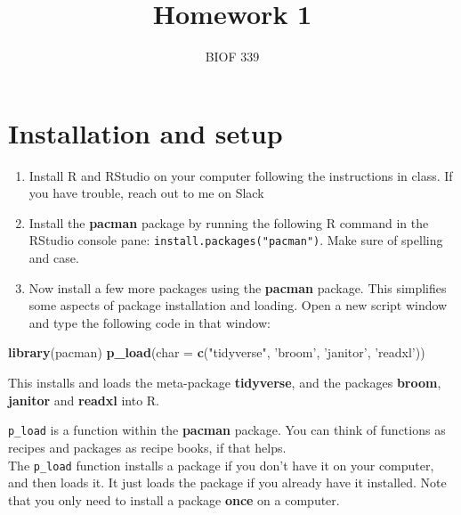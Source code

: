 \documentclass[
]{article}
\title{Homework 1}
\author{BIOF 339}
\date{}
\newenvironment{Shaded}{\begin{snugshade}}{\end{snugshade}}
\newcommand{\DataTypeTok}[1]{\textcolor[rgb]{0.13,0.29,0.53}{#1}}
\newcommand{\KeywordTok}[1]{\textcolor[rgb]{0.13,0.29,0.53}{\textbf{#1}}}
\newcommand{\NormalTok}[1]{#1}
\newcommand{\StringTok}[1]{\textcolor[rgb]{0.31,0.60,0.02}{#1}}
\providecommand{\tightlist}{%
  \setlength{\itemsep}{0pt}\setlength{\parskip}{0pt}}
\begin{document}
\maketitle

\hypertarget{installation-and-setup}{%
\section{Installation and setup}\label{installation-and-setup}}

\begin{enumerate}
\def\labelenumi{\arabic{enumi}.}
\tightlist
\item
  Install R and RStudio on your computer following the instructions in
  class. If you have trouble, reach out to me on Slack
\item
  Install the \textbf{pacman} package by running the following R command
  in the RStudio console pane: \texttt{install.packages("pacman")}. Make
  sure of spelling and case.
\item
  Now install a few more packages using the \textbf{pacman} package.
  This simplifies some aspects of package installation and loading. Open
  a new script window and type the following code in that window:
\end{enumerate}

\begin{Shaded}
\begin{Highlighting}[]
\KeywordTok{library}\NormalTok{(pacman)}
\KeywordTok{p_load}\NormalTok{(}\DataTypeTok{char =} \KeywordTok{c}\NormalTok{(}\StringTok{"tidyverse"}\NormalTok{, }\StringTok{'broom'}\NormalTok{, }\StringTok{'janitor'}\NormalTok{, }\StringTok{'readxl'}\NormalTok{))}
\end{Highlighting}
\end{Shaded}

This installs and loads the meta-package \textbf{tidyverse}, and the
packages \textbf{broom}, \textbf{janitor} and \textbf{readxl} into R.

\begin{infobox}

\texttt{p\_load} is a function within the \textbf{pacman} package. You
can think of functions as recipes and packages as recipe books, if that
helps.\\
The \texttt{p\_load} function installs a package if you don't have it on
your computer, and then loads it. It just loads the package if you
already have it installed. Note that you only need to install a package
\textbf{once} on a computer.

\end{infobox}
\end{document}
